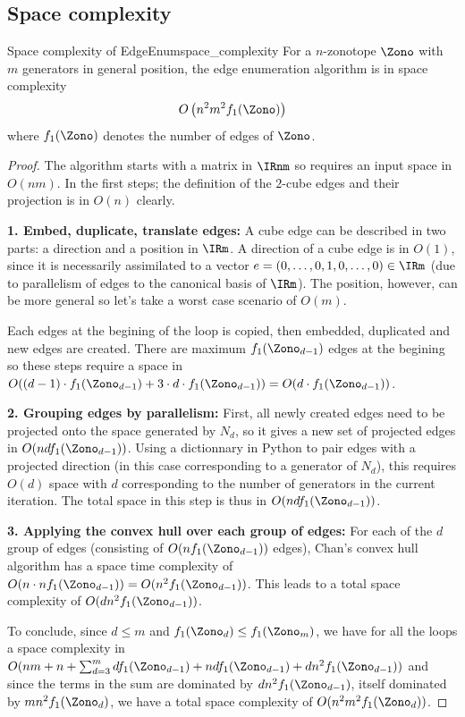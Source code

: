 \subsection{Space complexity}
\begin{theorembox}{Space complexity of EdgeEnum}{space_complexity}
    For a $n$-zonotope $\Zono$ with $m$ generators in general position, the edge enumeration algorithm is in space complexity
    $$O\left( n^2m^2f_1(\Zono)\right)$$
    where $f_1(\Zono)$ denotes the number of edges of $\Zono$.
\end{theorembox}
\begin{proof}
    The algorithm starts with a matrix in $\IRnm$ so requires an input space in $O(nm)$. In the first steps; the definition of the $2$-cube edges and their projection is in $O(n)$ clearly.

    \textbf{1. Embed, duplicate, translate edges:} 
    A cube edge can be described in two parts: a direction and a position in $\IRm$. A direction of a cube edge is in $O(1)$, since it is necessarily assimilated to a vector $e = (0, \dots, 0, 1, 0,\dots, 0) \in \IRm$ (due to parallelism of edges to the canonical basis of $\IRm$). The position, however, can be more general so let's take a worst case scenario of $O(m)$.

    Each edges at the begining of the loop is copied, then embedded, duplicated and new edges are created. There are maximum $f_1(\Zono_{d-1})$ edges at the begining so these steps require a space in $O((d-1)\cdot f_1(\Zono_{d-1}) + 3\cdot d\cdot f_1(\Zono_{d-1})) = O(d\cdot f_1(\Zono_{d-1}))$.

    \textbf{2. Grouping edges by parallelism:} 
    First, all newly created edges need to be projected onto the space generated by $N_d$, so it gives a new set of projected edges in $O(ndf_1(\Zono_{d-1}))$. Using a dictionnary in Python to pair edges with a projected direction (in this case corresponding to a generator of $N_d$), this requires $O(d)$ space with $d$ corresponding to the number of generators in the current iteration. The total space in this step is thus in $O(ndf_1(\Zono_{d-1}))$.
    
    \textbf{3. Applying the convex hull over each group of edges:} For each of the $d$ group of edges (consisting of $O(nf_1(\Zono_{d-1}))$ edges), Chan's convex hull algorithm has a space time complexity of $O(n\cdot nf_1(\Zono_{d-1})) = O(n^2 f_1(\Zono_{d-1}))$. This leads to a total space complexity of $O(dn^2f_1(\Zono_{d-1}))$.

    To conclude, since $d\leq m$ and $f_1(\Zono_d) \leq f_1(\Zono_m)$, we have for all the loops a space complexity in $O(nm + n + \sum_{d=3}^m df_1(\Zono_{d-1}) + ndf_1(\Zono_{d-1}) + dn^2f_1(\Zono_{d-1}))$ and since the terms in the sum are dominated by $dn^2f_1(\Zono_{d-1})$, itself dominated by $mn^2f_1(\Zono_d)$, we have a total space complexity of $O(n^2 m^2 f_1(\Zono_d))$.
\end{proof}

